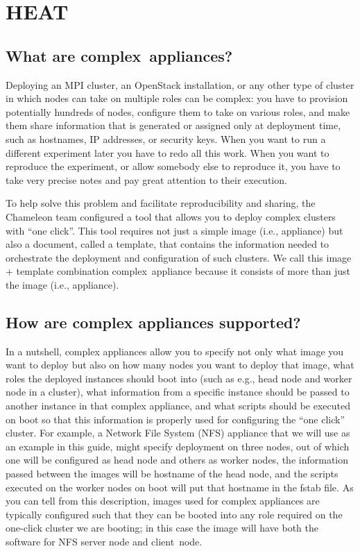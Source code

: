 \FILENAME

\chapter{HEAT}\label{complex-appliances}

\section{What are complex~appliances?}\label{what-are-complexappliances}

Deploying an MPI cluster, an OpenStack installation, or any other type
of cluster in which nodes can take on multiple roles can be complex: you
have to provision potentially hundreds of nodes, configure them to take
on various roles, and make them share information that is generated or
assigned only at deployment time, such as hostnames, IP addresses, or
security keys. When you want to run a different experiment later you
have to redo all this work. When you want to reproduce the experiment,
or allow somebody else to reproduce it, you have to take very precise
notes and pay great attention to their execution.

To help solve this problem and facilitate reproducibility and sharing,
the Chameleon team configured a tool that allows you to deploy complex
clusters with ``one click''. This tool requires not just a simple image
(i.e., appliance) but also a document, called a template, that contains
the information needed to orchestrate the deployment and configuration
of such clusters. We call this image + template combination
complex~appliance because it consists of more than just the image (i.e.,
appliance).

\section{How are complex appliances
supported?}\label{how-are-complex-appliances-supported}

In a nutshell, complex appliances allow you to specify not only what
image you want to deploy but also on how many nodes you want to deploy
that image, what roles the deployed instances should boot into (such as
e.g., head node and worker node in a cluster), what information from a
specific instance should be passed to another instance in that complex
appliance, and what scripts should be executed on boot so that this
information is properly used for configuring the ``one click'' cluster.
For example, a Network File System (NFS) appliance that we will use as
an example in this guide, might specify deployment on three nodes, out
of which one will be configured as head node and others as worker nodes,
the information passed between the images will be hostname of the head
node, and the scripts executed on the worker nodes on boot will put that
hostname in the fstab file. As you can tell from this description,
images used for complex appliances are typically configured such that
they can be booted into any role required on the one-click cluster we
are booting; in this case the image will have both the software for NFS
server node and client~node.

